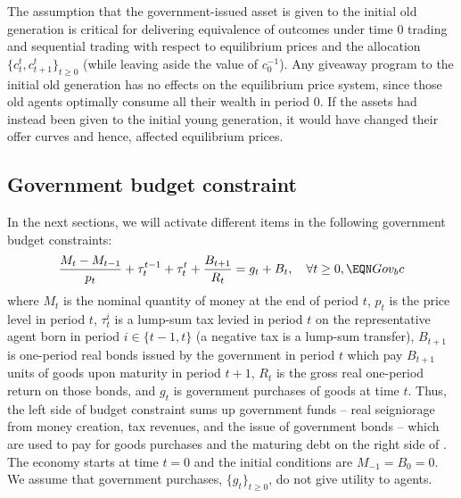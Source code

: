 The assumption that the government-issued asset 
is given to the initial old generation 
is critical for delivering  equivalence of 
outcomes under time $0$ trading and sequential 
trading with respect to equilibrium prices and
the allocation $\{c^t_t, c^t_{t+1}\}_{t\geq0}$
(while leaving aside the value of $c^{-1}_0$).
Any giveaway program to the 
initial old generation has no effects on the 
equilibrium price system, since 
those old agents optimally consume all their
wealth in period $0$. If the assets had
instead been given to the initial young generation,
it would have changed their offer curves and hence, 
affected equilibrium prices.




\subsection{Government budget constraint}
In the next sections, we will activate different items
in the following government budget constraints: 
$$ {M_t - M_{t-1} \over  p_t} + \tau^{t-1}_t + \tau^t_t 
+ {B_{t+1} \over R_t} = g_t + B_t,  \quad \forall t \geq 0, \EQN Gov_bc $$
where $M_t$ is the nominal quantity of money at the end of period $t$,
$p_t$ is the price level in period $t$, $\tau^i_t$ is a lump-sum
tax levied in period $t$ on the representative agent born in 
period $i\in\{t-1, t\}$ (a negative tax is a lump-sum transfer), 
$B_{t+1}$ is
one-period real bonds issued by the government in period $t$ which
pay $B_{t+1}$ units of goods upon maturity in period $t+1$, $R_t$
is the gross real one-period return on those bonds, and
$g_t$ is government purchases of goods at time $t$. Thus,
the left side of budget constraint  sums up
government funds -- real seigniorage from money creation,
tax revenues, and the issue of government bonds -- which are
used to pay for goods purchases and the maturing debt on
the right side of . The economy starts
at time $t=0$ and the initial conditions are 
$M_{-1}= B_0 = 0$. We assume that government purchases,
$\{g_t\}_{t \geq 0}$, do not give utility to agents.




